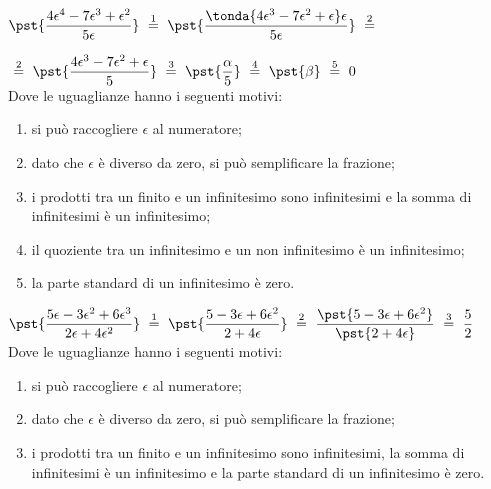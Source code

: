 \begin{esempio}

\(\pst{\dfrac{4 \epsilon^4 -7 \epsilon^3 + \epsilon^2}{5 \epsilon}} 
~ \stackrel{1}{=} ~
  \pst{\dfrac{\tonda{4 \epsilon^3 -7 \epsilon^2 + \epsilon} \epsilon}
                    {5 \epsilon}} 
~ \stackrel{2}{=} ~\)

\(~ \stackrel{2}{=} ~ 
  \pst{\dfrac{4 \epsilon^3 -7 \epsilon^2 + \epsilon}{5}} 
~ \stackrel{3}{=} ~
  \pst{\dfrac{\alpha}{5}}
~ \stackrel{4}{=} ~
  \pst{\beta}
~ \stackrel{5}{=} ~
  0\)\\

Dove le uguaglianze hanno i seguenti motivi:
\begin{enumerate} [nosep]
 \item si può raccogliere \(\epsilon\) al numeratore; 
 \item dato che \(\epsilon\) è diverso da zero, si può semplificare la 
frazione; 
 \item i prodotti tra un finito e un infinitesimo sono infinitesimi e la somma 
di infinitesimi è un infinitesimo;
 \item il quoziente tra un infinitesimo e un non infinitesimo è un infinitesimo;
 \item la parte standard di un infinitesimo è zero.
\end{enumerate}
\end{esempio}

\begin{esempio}

\(\pst{\dfrac{5\epsilon -3 \epsilon^2 + 6 \epsilon^3}
             {2\epsilon + 4 \epsilon^2}} 
~ \stackrel{1}{=} ~
  \pst{\dfrac{5 -3 \epsilon + 6 \epsilon^2}
             {2 + 4 \epsilon}} 
~ \stackrel{2}{=} ~
  \dfrac{\pst{5 -3 \epsilon + 6 \epsilon^2}}
             {\pst{2 + 4 \epsilon}} 
~ \stackrel{3}{=} ~
  \dfrac{5}{2}\)\\

Dove le uguaglianze hanno i seguenti motivi:
\begin{enumerate} [nosep]
 \item si può raccogliere \(\epsilon\) al numeratore; 
 \item dato che \(\epsilon\) è diverso da zero, si può semplificare la 
frazione; 
 \item i prodotti tra un finito e un infinitesimo sono infinitesimi, la somma 
di infinitesimi è un infinitesimo e la parte standard di un infinitesimo è zero.
\end{enumerate}
\end{esempio}

